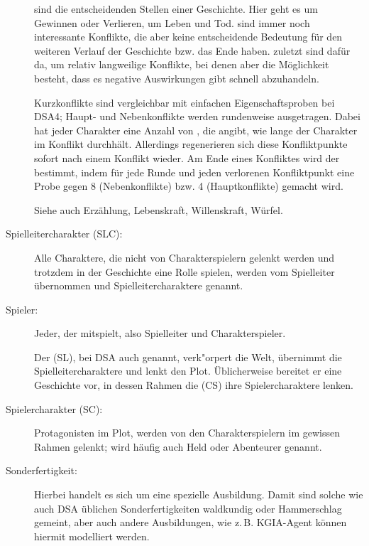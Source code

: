 \begin{description}
 sind die entscheidenden Stellen einer Geschichte. Hier geht es um Gewinnen oder Verlieren, um Leben und Tod.  sind immer noch interessante Konflikte, die aber keine entscheidende Bedeutung für den weiteren Verlauf der Geschichte bzw. das Ende haben.  zuletzt sind dafür da, um relativ langweilige Konflikte, bei denen aber die Möglichkeit besteht, dass es negative Auswirkungen gibt schnell abzuhandeln.

Kurzkonflikte sind vergleichbar mit einfachen Eigenschaftsproben bei DSA4; Haupt- und Nebenkonflikte werden rundenweise ausgetragen. Dabei hat jeder Charakter eine Anzahl von , die angibt, wie lange der Charakter im Konflikt durchhält. Allerdings regenerieren sich diese Konfliktpunkte sofort nach einem Konflikt wieder. Am Ende eines Konfliktes wird der  bestimmt, indem für jede Runde und jeden verlorenen Konfliktpunkt eine Probe gegen 8 (Nebenkonflikte) bzw. 4 (Hauptkonflikte) gemacht wird.

Siehe auch Erzählung, Lebenskraft, Willenskraft, Würfel.

\item[Spielleitercharakter (SLC):] Alle Charaktere, die nicht von Charakterspielern gelenkt werden und trotzdem in der Geschichte eine Rolle spielen, werden vom Spielleiter übernommen und Spielleitercharaktere genannt.

\item[Spieler:] Jeder, der mitspielt, also Spielleiter und Charakterspieler.

Der  (SL), bei DSA auch  genannt, verk"orpert die Welt, übernimmt die Spielleitercharaktere und lenkt den Plot. Üblicherweise bereitet er eine Geschichte vor, in dessen Rahmen die  (CS) ihre Spielercharaktere lenken.

\item[Spielercharakter (SC):] Protagonisten im Plot, werden von den Charakterspielern im gewissen Rahmen gelenkt; wird häufig auch Held oder Abenteurer genannt.

\item[Sonderfertigkeit:] Hierbei handelt es sich um eine spezielle Ausbildung. Damit sind solche wie auch DSA üblichen Sonderfertigkeiten waldkundig oder Hammerschlag gemeint, aber auch andere Ausbildungen, wie z.\,B. KGIA-Agent können hiermit modelliert werden.


\end{description}
